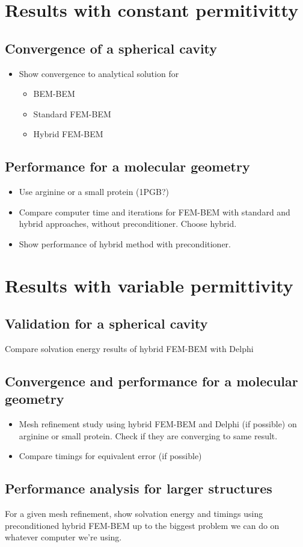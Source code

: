 \section*{\sffamily \Large Results with constant permitivitty}

\subsection*{\sffamily \large Convergence of a spherical cavity}
\begin{itemize}
    \item Show convergence to analytical solution for
    \begin{itemize}
        \item BEM-BEM
        \item Standard FEM-BEM
        \item Hybrid FEM-BEM
    \end{itemize}
\end{itemize}

\subsection*{\sffamily \large Performance for a molecular geometry}
\begin{itemize}
    \item Use arginine or a small protein (1PGB?)
    \item Compare computer time and iterations for FEM-BEM with standard and hybrid approaches, without preconditioner. Choose hybrid.
    \item Show performance of hybrid method with preconditioner.
\end{itemize}

\section*{\sffamily \Large Results with variable permittivity}

\subsection*{\sffamily \large Validation for a spherical cavity}

Compare solvation energy results of hybrid FEM-BEM with Delphi

\subsection*{\sffamily \large Convergence and performance for a molecular geometry}
\begin{itemize}
    \item Mesh refinement study using hybrid FEM-BEM and Delphi (if possible) on arginine or small protein. Check if they are converging to same result.
    \item Compare timings for equivalent error (if possible)
\end{itemize}

\subsection*{\sffamily \large Performance analysis for larger structures}

For a given mesh refinement, show solvation energy and timings using preconditioned hybrid FEM-BEM up to the biggest problem we can do on whatever computer we're using.